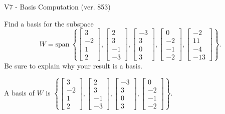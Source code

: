 \begin{exercise}
  \begin{exerciseTitle}V7 - Basis Computation (ver. 853)\end{exerciseTitle}
  \begin{exerciseStatement}
    Find a basis for the subspace 
\[W=\mathrm{span}\ \left\{\left[\begin{array}{r}
3 \\
-2 \\
1 \\
2
\end{array}\right] , \left[\begin{array}{r}
2 \\
3 \\
-1 \\
-3
\end{array}\right] , \left[\begin{array}{r}
-3 \\
3 \\
0 \\
3
\end{array}\right] , \left[\begin{array}{r}
0 \\
-2 \\
-1 \\
-2
\end{array}\right] , \left[\begin{array}{r}
-2 \\
11 \\
-4 \\
-13
\end{array}\right]\right\}.\]
 Be sure to explain why your result is a basis.


  \end{exerciseStatement}
  \begin{exerciseAnswer}
   A basis of \(W\) is  \(\left\{\left[\begin{array}{r}
3 \\
-2 \\
1 \\
2
\end{array}\right] , \left[\begin{array}{r}
2 \\
3 \\
-1 \\
-3
\end{array}\right] , \left[\begin{array}{r}
-3 \\
3 \\
0 \\
3
\end{array}\right] , \left[\begin{array}{r}
0 \\
-2 \\
-1 \\
-2
\end{array}\right]\right\}\).
  


  \end{exerciseAnswer}
\end{exercise}
